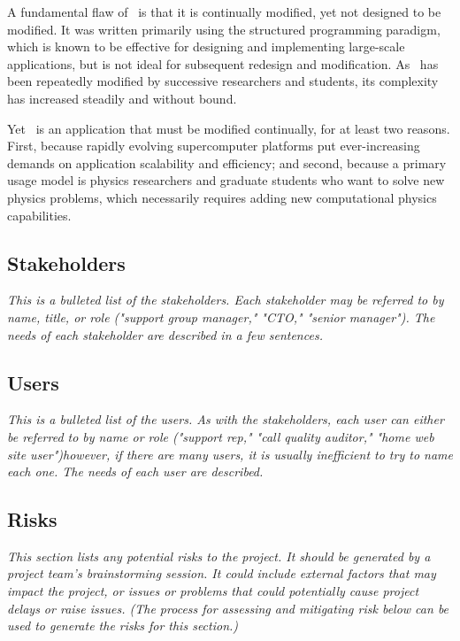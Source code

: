 \documentclass[12pt]{article}
\begin{document}
    A fundamental flaw of \enzo\ is that it is continually modified,
    yet not designed to be modified.  It was written primarily using
    the structured programming paradigm, which is known to be
    effective for designing and implementing large-scale applications,
    but is not ideal for subsequent redesign and modification.  As
    \enzo\ has been repeatedly modified by successive researchers and
    students, its complexity has increased steadily and without bound.

    Yet \enzo\ is an application that must be modified continually,
    for at least two reasons.  First, because rapidly evolving
    supercomputer platforms put ever-increasing demands on application
    scalability and efficiency; and second, because a primary usage
    model is physics researchers and graduate students who want to
    solve new physics problems, which necessarily requires adding new
    computational physics capabilities.
    

\subsection{Stakeholders}

    \textit{This is a bulleted list of the stakeholders. Each stakeholder may
    be referred to by name, title, or role ("support group manager,"
    "CTO," "senior manager"). The needs of each stakeholder are
    described in a few sentences.}

\subsection{Users}

    \textit{This is a bulleted list of the users. As with the stakeholders,
    each user can either be referred to by name or role ("support
    rep," "call quality auditor," "home web site user")however, if
    there are many users, it is usually inefficient to try to name
    each one. The needs of each user are described.}

\subsection{Risks}

    \textit{This section lists any potential risks to the project. It should
    be generated by a project team's brainstorming session. It could
    include external factors that may impact the project, or issues or
    problems that could potentially cause project delays or raise
    issues. (The process for assessing and mitigating risk below can
    be used to generate the risks for this section.)}
\end{document}
